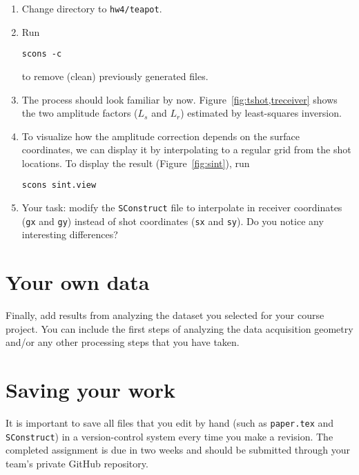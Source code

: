 \begin{enumerate}

\item Change directory to \texttt{hw4/teapot}.
\item Run
\begin{verbatim}
scons -c
\end{verbatim}
to remove (clean) previously generated files.
\item The process should look familiar by now. Figure~\ref{fig:tshot,treceiver} shows the two amplitude factors ($L_s$ and $L_r$) estimated by least-squares inversion.
\item To visualize how the amplitude correction depends on the surface coordinates, we can display it by interpolating to a regular grid from the shot locations. To display the result (Figure~\ref{fig:sint}), run
\begin{verbatim}
scons sint.view
\end{verbatim}
\item Your task: modify the \texttt{SConstruct} file to interpolate in receiver coordinates (\texttt{gx} and \texttt{gy}) instead of shot coordinates (\texttt{sx} and \texttt{sy}). Do you notice any interesting differences?

\end{enumerate}



\lstset{language=python,numbers=left,numberstyle=\tiny,showstringspaces=false}


\section{Your own data}

Finally, add results from analyzing the dataset you selected for your
course project. You can include the first steps of analyzing the data
acquisition geometry and/or any other processing steps that you have
taken.

\section{Saving your work}

It is important to save all files that you edit by hand (such
as \texttt{paper.tex} and \texttt{SConstruct}) in a version-control
system every time you make a revision.  The completed assignment is
due in two weeks and should be submitted through your team's private
GitHub repository.





